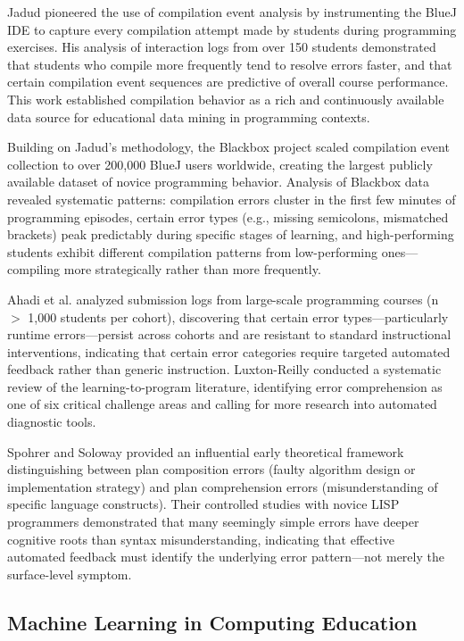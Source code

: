 \documentclass[10pt,a4paper]{article}
\begin{document}
Jadud \cite{jadud2006methods} pioneered the use of compilation event analysis
by instrumenting the BlueJ IDE to capture every compilation attempt made by
students during programming exercises. His analysis of interaction logs from
over 150 students demonstrated that students who compile more frequently tend
to resolve errors faster, and that certain compilation event sequences are
predictive of overall course performance. This work established compilation
behavior as a rich and continuously available data source for educational data
mining in programming contexts.

Building on Jadud's methodology, the Blackbox project \cite{bey2022analyzing}
scaled compilation event collection to over 200,000 BlueJ users worldwide,
creating the largest publicly available dataset of novice programming behavior.
Analysis of Blackbox data revealed systematic patterns: compilation errors
cluster in the first few minutes of programming episodes, certain error types
(e.g., missing semicolons, mismatched brackets) peak predictably during
specific stages of learning, and high-performing students exhibit different
compilation patterns from low-performing ones---compiling more strategically
rather than more frequently.

Ahadi et al. \cite{ahadi2015exploring} analyzed submission logs from
large-scale programming courses (n $>$ 1,000 students per cohort), discovering
that certain error types---particularly runtime errors---persist across cohorts
and are resistant to standard instructional interventions, indicating that
certain error categories require targeted automated feedback rather than
generic instruction. Luxton-Reilly \cite{barbosa2023feedback} conducted a
systematic review of the learning-to-program literature, identifying error
comprehension as one of six critical challenge areas and calling for more
research into automated diagnostic tools.

Spohrer and Soloway \cite{spohrer1986novice} provided an influential early
theoretical framework distinguishing between plan composition errors (faulty
algorithm design or implementation strategy) and plan comprehension errors
(misunderstanding of specific language constructs). Their controlled studies
with novice LISP programmers demonstrated that many seemingly simple errors
have deeper cognitive roots than syntax misunderstanding, indicating that
effective automated feedback must identify the underlying error pattern---not
merely the surface-level symptom.

\subsection{Machine Learning in Computing Education}
\end{document}
